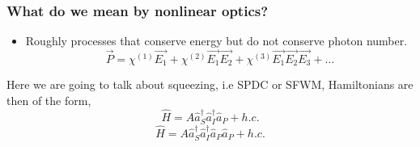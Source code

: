 \documentclass{beamer}
\renewcommand{\annia}{\hat{a}}
\renewcommand{\creata}{\hat{a}^\dagger}
\begin{document}
\begin{frame}
\frametitle{What do we mean by nonlinear optics?}
\begin{itemize} 
    \item Roughly processes that conserve energy but do not conserve photon number. 
        \begin{equation}
            \vec{P}= \chi^{(1)} \vec{E_1} + \chi^{(2)}\vec{E_1}\vec{E_2} + \chi^{(3)}\vec{E_1}\vec{E_2}\vec{E_3} + \dots
        \end{equation}
\end{itemize}
Here we are going to talk about squeezing, i.e SPDC or SFWM, Hamiltonians are then of the form, 
\begin{equation} 
    \hat{H} = A \creata_S \creata_I \annia_P + h.c.
\end{equation}
\begin{equation} 
    \hat{H} = A \creata_S \creata_I \annia_P \annia_P + h.c.
\end{equation}
\end{frame}
\end{document}
